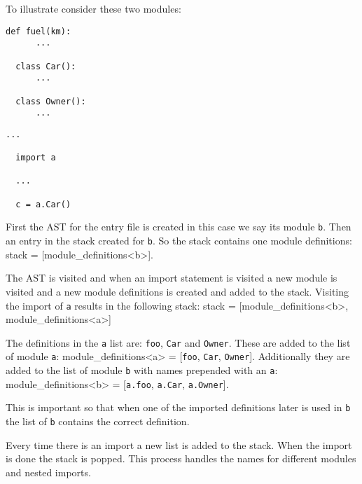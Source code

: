 To illustrate consider these two modules:

\begin{lstlisting}[style=python, caption={A module that defines a function and two classes called \texttt{a}}, label={import:definition_module}]
  def fuel(km):
      ...

  class Car():
      ...

  class Owner():
      ...
\end{lstlisting}
\begin{lstlisting}[style=python, caption={A module called \texttt{b} importing the above module \texttt{a}}, label={import:import_module}]
  ...
  
  import a
  
  ...

  c = a.Car()
\end{lstlisting}

First the AST for the entry file is created in this case we say its module \texttt{b}.
Then an entry in the stack created for \texttt{b}.
So the stack contains one module definitions: stack = [module\_definitions<b>].

The AST is visited and when an import statement is visited a new module is visited and a new module definitions is created and added to the stack.
Visiting the import of \texttt{a} results in the following stack: stack = [module\_definitions<b>, module\_definitions<a>]

The definitions in the \texttt{a} list are: \texttt{foo}, \texttt{Car} and \texttt{Owner}.
These are added to the list of module \texttt{a}: module\_definitions<a> = [\texttt{foo}, \texttt{Car}, \texttt{Owner}].
Additionally they are added to the list of module \texttt{b} with names prepended with an \texttt{a}:  module\_definitions<b> = [\texttt{a.foo}, \texttt{a.Car}, \texttt{a.Owner}].

This is important so that when one of the imported definitions later is used in \texttt{b} the list of \texttt{b} contains the correct definition.

Every time there is an import a new list is added to the stack.
When the import is done the stack is popped.
This process handles the names for different modules and nested imports.
